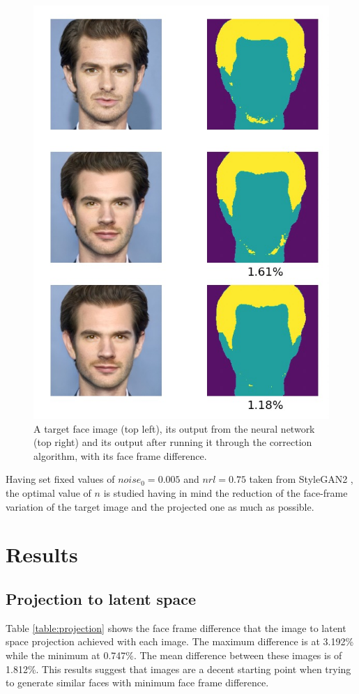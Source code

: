 \documentclass[review]{elsarticle}
\begin{document}
\begin{figure}[H]
  \includegraphics[width=0.5\linewidth, center]{Images/750.jpeg}
  \caption{A target face image (top left), its output from the neural network (top right) and its output after running it through the correction algorithm, with its face frame difference.}
  \label{fig:correction_demo}
\end{figure}

Having set fixed values of $noise_0 = 0.005$ and $nrl = 0.75$ taken from StyleGAN2 \citep{stylegangithub}, the optimal value of $n$ is studied having in mind the reduction of the face-frame variation of the target image and the projected one as much as possible.

\section{Results}\label{section:results}

\subsection{Projection to latent space}

Table \ref{table:projection} shows the face frame difference that the image to latent space projection achieved with each image. The maximum difference is at 3.192\% while the minimum at 0.747\%. The mean difference between these images is of 1.812\%. This results suggest that images are a decent starting point when trying to generate similar faces with minimum face frame difference. 
\end{document}

